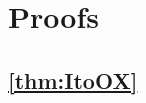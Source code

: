\documentclass[11pt]{article}
\theoremstyle{plain}
\theoremstyle{definition}
\DeclareMathOperator{\N}{\mathbb{N}}
\DeclareMathOperator{\R}{\mathbb{R}}
\DeclareMathOperator{\calM}{\mathcal{M}}
\DeclareMathOperator{\calO}{\mathcal{O}}
\DeclareMathOperator{\calR}{\mathcal{R}}
\DeclareMathOperator{\frakS}{\mathfrak{S}}
\begin{document}

\section{Proofs}\label{app:Proofs}



\subsection{\cref{thm:ItoOX}}\label{app:ItoOX}
\end{document}
